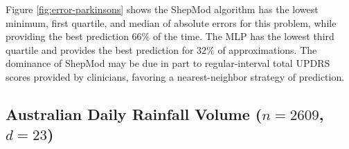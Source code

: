 Figure \ref{fig:error-parkinsons} shows the ShepMod algorithm has the
lowest minimum, first quartile, and median of absolute errors for this
problem, while providing the best prediction $66\%$ of the time. The
MLP has the lowest third quartile and provides the best prediction for
$32\%$ of approximations. The dominance of ShepMod may be due in part
to regular-interval total UPDRS scores provided by clinicians,
favoring a nearest-neighbor strategy of prediction.



\subsection{Australian Daily Rainfall Volume ($n = 2609$, $d = 23$)}

